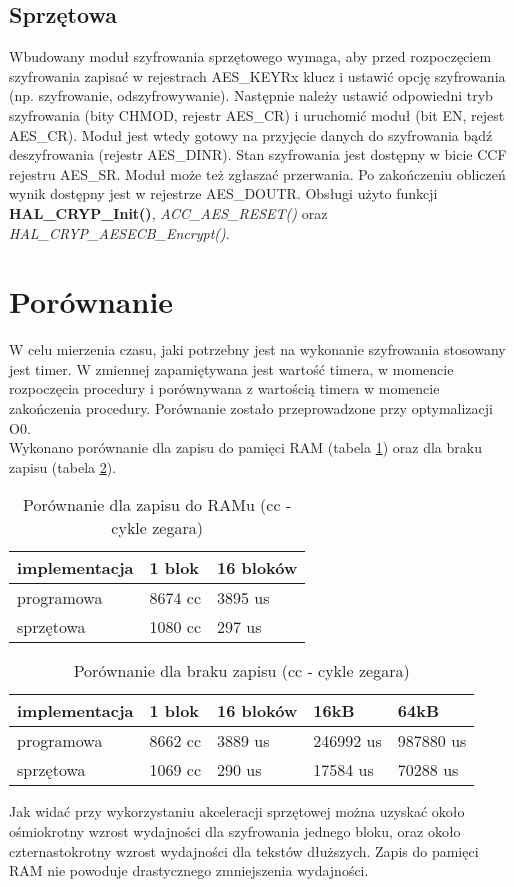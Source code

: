 \documentclass[a4paper, 10pt]{article}
\begin{document}
	\subsection{Sprzętowa}
	Wbudowany moduł szyfrowania sprzętowego wymaga, aby przed rozpoczęciem szyfrowania zapisać w rejestrach AES\_KEYRx klucz i ustawić opcję szyfrowania (np. szyfrowanie, odszyfrowywanie). Następnie należy ustawić odpowiedni tryb  szyfrowania (bity CHMOD, rejestr AES\_CR) i uruchomić moduł (bit EN, rejest AES\_CR). Moduł jest wtedy gotowy na przyjęcie danych do szyfrowania bądź deszyfrowania (rejestr AES\_DINR). Stan szyfrowania jest dostępny w bicie CCF rejestru AES\_SR. Moduł może też zgłaszać przerwania. Po zakończeniu obliczeń wynik dostępny jest w rejestrze AES\_DOUTR. Obsługi użyto funkcji \textbf{HAL\_CRYP\_Init()}, \textit{ACC\_AES\_RESET()} oraz \textit{HAL\_CRYP\_AESECB\_Encrypt()}.
	\section{Porównanie}
	W celu mierzenia czasu, jaki potrzebny jest na wykonanie szyfrowania stosowany jest timer. W zmiennej zapamiętywana jest wartość timera, w momencie rozpoczęcia procedury i porównywana z wartością timera w momencie zakończenia procedury. Porównanie zostało przeprowadzone przy optymalizacji O0.\\
	Wykonano porównanie dla zapisu do pamięci RAM (tabela \ref{tab:ram}) oraz dla braku zapisu (tabela \ref{tab:discard}).
	
	
	\begin{table}[]
	\centering
	\caption{Porównanie dla zapisu do RAMu (cc - cykle zegara)}
	\label{tab:ram}
	\begin{tabular}{@{}lll@{}}
	\toprule
	implementacja & 1 blok  & 16 bloków \\ \midrule
	programowa    & 8674 cc & 3895 us   \\
	sprzętowa     & 1080 cc & 297 us    \\ \bottomrule
	\end{tabular}
	\end{table}
	
	\begin{table}[]
	
	\centering
	\caption{Porównanie dla braku zapisu (cc - cykle zegara)}
	\label{tab:discard}
	\begin{tabular}{@{}lllll@{}}
	\toprule
	implementacja & 1 blok  & 16 bloków & 16kB      & 64kB      \\ \midrule
	programowa    & 8662 cc & 3889 us   & 246992 us & 987880 us \\
	sprzętowa     & 1069 cc & 290 us    & 17584 us  & 70288 us  \\ \bottomrule
	\end{tabular}
	\end{table}
	
	Jak widać przy wykorzystaniu akceleracji sprzętowej można uzyskać około ośmiokrotny wzrost wydajności dla szyfrowania jednego bloku, oraz około czternastokrotny wzrost wydajności dla tekstów dłuższych. Zapis do pamięci RAM nie powoduje drastycznego zmniejszenia wydajności.
	
	
\end{document}
